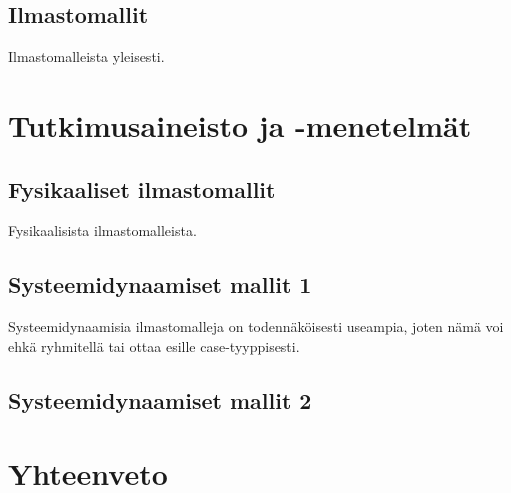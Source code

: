 \documentclass[finnish,12pt,a4paper,pdftex]{article}
\begin{document}
\subsection{Ilmastomallit}
Ilmastomalleista yleisesti.


\clearpage

\section{Tutkimusaineisto ja -menetelmät}

\subsection{Fysikaaliset ilmastomallit}
Fysikaalisista ilmastomalleista. 

\subsection{Systeemidynaamiset mallit 1}
Systeemidynaamisia ilmastomalleja on todennäköisesti useampia, joten nämä voi ehkä ryhmitellä tai ottaa esille case-tyyppisesti. 

\subsection{Systeemidynaamiset mallit 2}


\clearpage




\section{Yhteenveto}
\end{document}
